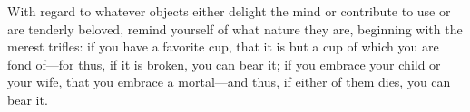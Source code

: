 With regard to whatever objects either delight the mind or contribute to use or
are tenderly beloved,  remind yourself of what nature they  are, beginning with
the merest trifles: if  you have a favorite cup, that it is  but a cup of which
you are fond  of---for thus, if it is  broken, you can bear it;  if you embrace
your child  or your wife,  that you embrace a  mortal---and thus, if  either of
them dies, you can bear it.
